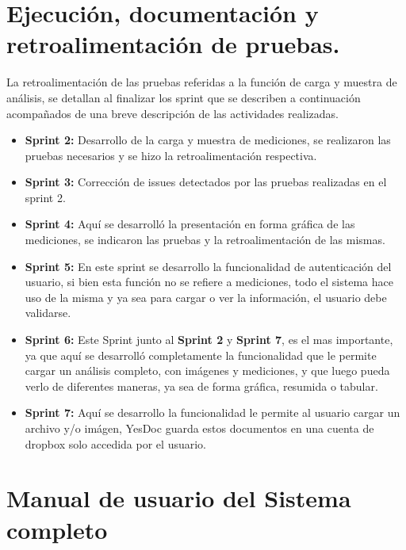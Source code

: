 \documentclass[a4paper,12pt]{article}
\begin{document}
\section{Ejecución, documentación y retroalimentación de pruebas.}
 La retroalimentación de las pruebas referidas a la función de carga y muestra de análisis, se detallan al finalizar los sprint que se describen a continuación acompañados de una breve descripción de las actividades realizadas.
 \begin{itemize}
 	\item \textbf{Sprint 2:} Desarrollo de la carga y muestra de mediciones, se realizaron las pruebas necesarios y se hizo la retroalimentación respectiva.
 	\item \textbf{Sprint 3:} Corrección de issues detectados por las pruebas realizadas en el sprint 2.
 	\item \textbf{Sprint 4:} Aquí se desarrolló la presentación en forma gráfica de las mediciones, se indicaron las pruebas y la retroalimentación de las mismas.
 	\item \textbf{Sprint 5:} En este sprint se desarrollo la funcionalidad de autenticación del usuario, si bien esta función no se refiere a mediciones, todo el sistema hace uso de la misma y ya sea para cargar o ver la información, el usuario debe validarse.
 	\item \textbf{Sprint 6: } Este Sprint junto al \textbf{Sprint 2} y \textbf{Sprint 7}, es el mas importante, ya que aquí se desarrolló completamente la funcionalidad que le permite cargar un análisis completo, con imágenes y mediciones,  y que luego pueda verlo de diferentes maneras, ya sea de forma gráfica, resumida o tabular.
 	\item \textbf{Sprint 7: } Aquí se desarrollo la funcionalidad le permite al usuario cargar un archivo y/o imágen, YesDoc guarda estos documentos en una cuenta de dropbox solo accedida por el usuario.
 \end{itemize}
\section{Manual de usuario del Sistema completo} \label{manual_usuario}
\end{document}
